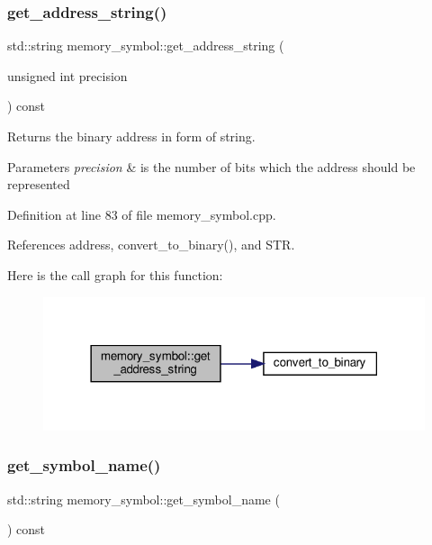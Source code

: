 \subsubsection{\texorpdfstring{get\+\_\+address\+\_\+string()}{get\_address\_string()}}
{\footnotesize\ttfamily std\+::string memory\+\_\+symbol\+::get\+\_\+address\+\_\+string (\begin{DoxyParamCaption}\item[{unsigned int}]{precision }\end{DoxyParamCaption}) const}



Returns the binary address in form of string. 


\begin{DoxyParams}{Parameters}
{\em precision} & is the number of bits which the address should be represented \\
\hline
\end{DoxyParams}


Definition at line 83 of file memory\+\_\+symbol.\+cpp.



References address, convert\+\_\+to\+\_\+binary(), and S\+TR.

Here is the call graph for this function\+:
\nopagebreak
\begin{figure}[H]
\begin{center}
\leavevmode
\includegraphics[width=318pt]{db/d51/classmemory__symbol_ac1ec379fc8366abbeea5bebf3c467cfd_cgraph}
\end{center}
\end{figure}
\mbox{\label{classmemory__symbol_a3846fec2895c18601c8a870510e36def}} 
\subsubsection{\texorpdfstring{get\+\_\+symbol\+\_\+name()}{get\_symbol\_name()}}
{\footnotesize\ttfamily std\+::string memory\+\_\+symbol\+::get\+\_\+symbol\+\_\+name (\begin{DoxyParamCaption}{ }\end{DoxyParamCaption}) const}



